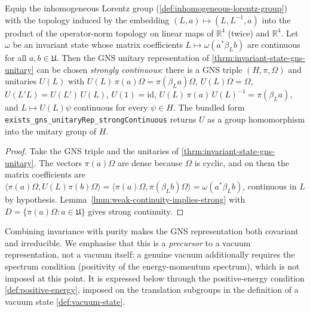\begin{theorem}
    \label{thrm:invariant-state-gns-unitary-strongly-continuous}
    \leanok
    Equip the inhomogeneous Lorentz group (\ref{def:inhomogeneous-lorentz-group}) with the topology induced by the embedding $(L, a) \mapsto (L, L^{-1}, a)$ into the product of the operator-norm topology on linear maps of $\mathbb{R}^4$ (twice) and $\mathbb{R}^4$. Let $\omega$ be an invariant state whose matrix coefficients $L \mapsto \omega(a^* \beta_L b)$ are continuous for all $a, b \in \mathfrak{U}$. Then the GNS unitary representation of \ref{thrm:invariant-state-gns-unitary} can be chosen \emph{strongly continuous}: there is a GNS triple $(H, \pi, \Omega)$ and unitaries $U(L)$ with $U(L)\,\pi(a)\Omega = \pi(\beta_L a)\Omega$, $U(L)\Omega = \Omega$, $U(L'L) = U(L')\,U(L)$, $U(1) = \mathrm{id}$, $U(L)\,\pi(a)\,U(L)^{-1} = \pi(\beta_L a)$, and $L \mapsto U(L)\psi$ continuous for every $\psi \in H$. The bundled form \texttt{exists\_gns\_unitaryRep\_strongContinuous} returns $U$ as a group homomorphism into the unitary group of $H$.
\end{theorem}
\begin{proof}
    \leanok
    Take the GNS triple and the unitaries of \ref{thrm:invariant-state-gns-unitary}. The vectors $\pi(a)\Omega$ are dense because $\Omega$ is cyclic, and on them the matrix coefficients are $\langle \pi(a)\Omega, U(L)\pi(b)\Omega\rangle = \langle \pi(a)\Omega, \pi(\beta_L b)\Omega\rangle = \omega(a^* \beta_L b)$, continuous in $L$ by hypothesis. Lemma~\ref{lmm:weak-continuity-implies-strong} with $D = \{\pi(a)\Omega : a \in \mathfrak{U}\}$ gives strong continuity.
\end{proof}

Combining invariance with purity makes the GNS representation both covariant and irreducible. We emphasise that this is a \emph{precursor} to a vacuum representation, not a vacuum itself: a genuine vacuum additionally requires the spectrum condition (positivity of the energy-momentum spectrum), which is not imposed at this point. It is expressed below through the positive-energy condition \ref{def:positive-energy}, imposed on the translation subgroups in the definition of a vacuum state \ref{def:vacuum-state}.

